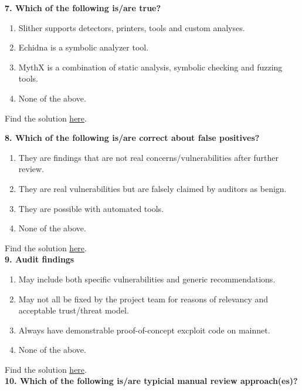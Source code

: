 \textbf{7. Which of the following is/are true?}

\begin{enumerate}[label=\Alph*.]
    \item Slither supports detectors, printers, tools and custom analyses.
    \item Echidna is a symbolic analyzer tool.
    \item MythX is a combination of static analysis, symbolic checking and fuzzing tools.
    \item None of the above.
\end{enumerate}

Find the solution \hyperref[sec:exam6_q7]{here}.\\

\pagebreak

\textbf{8. Which of the following is/are correct about false positives?}

\begin{enumerate}[label=\Alph*.]
    \item They are findings that are not real concerns/vulnerabilities after further review.
    \item They are real vulnerabilities but are falsely claimed by auditors as benign.
    \item They are possible with automated tools.
    \item None of the above.
\end{enumerate}

Find the solution \hyperref[sec:exam6_q8]{here}.\\

\textbf{9. Audit findings}

\begin{enumerate}[label=\Alph*.]
    \item May include both specific vulnerabilities and generic recommendations.
    \item May not all be fixed by the project team for reasons of relevancy and acceptable trust/threat model.
    \item Always have demonstrable proof-of-concept excploit code on mainnet.
    \item None of the above.
\end{enumerate}

Find the solution \hyperref[sec:exam6_q9]{here}.\\

\textbf{10. Which of the following is/are typicial manual review approach(es)?}

